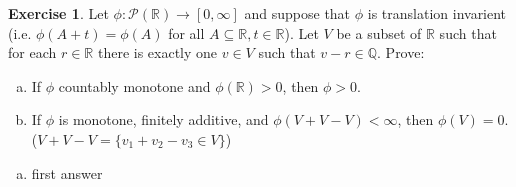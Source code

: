 \documentclass[11pt,oneside]{article}
\numberwithin{equation}{section}
\theoremstyle{definition}
\newtheorem{exercise}{Exercise}
\def\RR{\mathbb{R}}
\def\QQ{\mathbb{Q}}
\begin{document}
\begin{exercise}
  Let $ \phi : \mathcal{P}(\RR) \to [0, \infty]$ and suppose that
  $\phi$ is translation invarient (i.e. $ \phi ( A + t) = \phi (A) $
  for all $ A \subseteq \RR, t \in \RR$).  Let $V$ be a subset of $\RR$ such that
  for each $r \in \RR$ there is exactly one $v \in V$ such that $v - r \in \QQ$.
  Prove:
  \begin{enumerate}[(a)]
  \item
    If $ \phi$ countably monotone and $ \phi (\RR) > 0$, then $\phi >
    0$.
  \item
    If $\phi$ is monotone, finitely additive, and $\phi(V + V - V) < \infty$, then
    $\phi(V) = 0$.  ($V + V - V = \{ v_1 + v_2 - v_3 \in V\}$)
  \end{enumerate}
\end{exercise}
\begin{solution}
\begin{enumerate}[(a)]
\item
  first answer
\end{enumerate}
\end{solution}


\begin{comment}
\begin{exercise}
  problem
\end{exercise}
\begin{solution}
\begin{enumerate}[(a)]
\item
  first answer
\end{enumerate}
\end{solution}
\end{comment}
\end{document}
